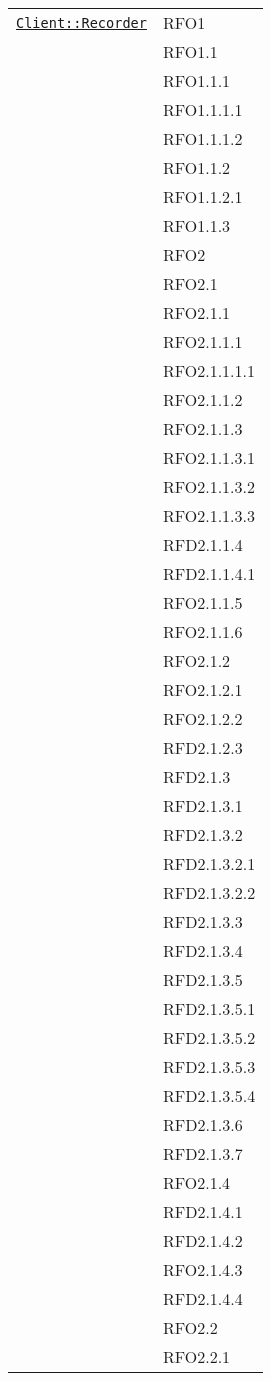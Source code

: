 \begin{longtable}{|>{\centering}m{10cm}|m{3cm}<{\centering}|}
\hyperref[Client::Recorder]{\texttt{Client::Recorder}} & RFO1\\
& RFO1.1\\
& RFO1.1.1\\
& RFO1.1.1.1\\
& RFO1.1.1.2\\
& RFO1.1.2\\
& RFO1.1.2.1\\
& RFO1.1.3\\
& RFO2\\
& RFO2.1\\
& RFO2.1.1\\
& RFO2.1.1.1\\
& RFO2.1.1.1.1\\
& RFO2.1.1.2\\
& RFO2.1.1.3\\
& RFO2.1.1.3.1\\
& RFO2.1.1.3.2\\
& RFO2.1.1.3.3\\
& RFD2.1.1.4\\
& RFD2.1.1.4.1\\
& RFO2.1.1.5\\
& RFO2.1.1.6\\
& RFO2.1.2\\
& RFO2.1.2.1\\
& RFO2.1.2.2\\
& RFD2.1.2.3\\
& RFD2.1.3\\
& RFD2.1.3.1\\
& RFD2.1.3.2\\
& RFD2.1.3.2.1\\
& RFD2.1.3.2.2\\
& RFD2.1.3.3\\
& RFD2.1.3.4\\
& RFD2.1.3.5\\
& RFD2.1.3.5.1\\
& RFD2.1.3.5.2\\
& RFD2.1.3.5.3\\
& RFD2.1.3.5.4\\
& RFD2.1.3.6\\
& RFD2.1.3.7\\
& RFO2.1.4\\
& RFD2.1.4.1\\
& RFD2.1.4.2\\
& RFO2.1.4.3\\
& RFD2.1.4.4\\
& RFO2.2\\
& RFO2.2.1\\

\end{longtable}
